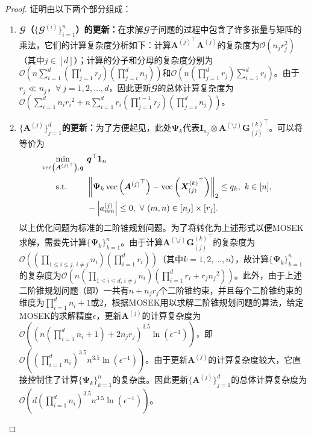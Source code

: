 \begin{proof}
证明由以下两个部分组成：
\begin{enumerate}
    \item \textbf{$\mathbfcal{G}$（$\{\mathbfcal{G}^{(i)}\}_{i=1}^{n}$）的更新：}在求解$\mathbfcal{G}$子问题的过程中包含了许多张量与矩阵的乘法，它们的计算复杂度分析如下：计算${\boldsymbol{A}^{(j)}}^{\top}\boldsymbol{A}^{(j)}$的复杂度为$\mathcal{O}(n_{j}{r}_j^{2})$（其中$j\in[d]$）；计算的分子和分母的复杂度分别为$\mathcal{O}(n\sum_{i=1}^{d}\allowbreak(\prod_{j=1}^{i}r_{j})\allowbreak(\prod_{j=i}^{d}n_{j}))$和$\mathcal{O}(n\allowbreak(\prod_{j=1}^{d}r_{j})\allowbreak\sum_{i=1}^{d}r_{i})$。由于$r_{j}\ll n_{j}$，$\forall~j =1,2,\ldots,d$，因此更新$\mathbfcal{G}$的总体计算复杂度为$\mathcal{O}(\sum_{i=1}^{d}n_{i}{r_i}^{2} + n\sum_{i=1}^{d}r_{i}\allowbreak(\prod_{j=1}^{i-1}r_{j})\allowbreak(\prod_{j=i}^{d}n_{j}))$。

    \item \textbf{$\{\boldsymbol{A}^{(j)}\}_{j=1}^{d}$的更新：}为了方便起见，此处$\boldsymbol{\Psi}_{k}$代表$\boldsymbol{I}_{n_{j}}\otimes \boldsymbol{A}^{(\setminus j)}\allowbreak {\boldsymbol{G}^{(k)}_{(j)}}^{\top}$。可以将等价为
\begin{equation}\label{eq:reform-socp}
	\begin{aligned}
		&\underset{\mathclap{\operatorname{vec}\left({\boldsymbol{A}^{(j)}}^{\top}\right),\boldsymbol{q}}}{\min} \quad && \boldsymbol{q}^{\top}\boldsymbol{1}_{n}\\
		&\text{s.t.} &&
		\left\|\boldsymbol{\Psi}_{k}\operatorname{vec}\left({\boldsymbol{A}^{(j)}}^{\top}\right)-\operatorname{vec}\left({\boldsymbol{X}^{(k)}_{(j)}}^{\top}\right)\right\|_{2} \le q_{k},~ k\in[n], \\\span&& -\abs{a^{(j)}_{mn}}\leq 0,~\forall~ (m,n)\in[n_{j}]\times[r_{j}].
		\end{aligned}
\end{equation}
以上优化问题为标准的二阶锥规划问题。为了将转化为上述形式以便MOSEK求解，需要先计算$\{\boldsymbol{\Psi}_{k}\}_{k=1}^{n}$。由于计算$\boldsymbol{A}^{(\setminus j)}{\boldsymbol{G}^{(k)}_{(j)}}^{\top}$的复杂度为$\mathcal{O}((\prod_{1\le i\le j,\,i\neq j}n_{i})\allowbreak(\prod_{i=1}^{d}r_{i}))$（其中$k=1,2,\ldots,n$），故计算$\{\boldsymbol{\Psi}_{k}\}_{k=1}^{n}$的复杂度为$\mathcal{O}(n(\prod_{1\le i\le d,\,i\neq j}n_{i})\allowbreak(\prod_{i=1}^{d}r_{i}+r_{j}{n_j}^{2}))$。此外，由于上述二阶锥规划问题（即）一共有$n+n_{j}r_{j}$个二阶锥约束，并且每个二阶锥约束的维度为$\prod_{i=1}^{d}n_{i}+1$或$2$，根据MOSEK用以求解二阶锥规划问题的算法，给定MOSEK的求解精度$\epsilon$，更新$\boldsymbol{A}^{(j)}$的计算复杂度为$\mathcal{O}((n(\prod_{i=1}^{d}n_{i}+1)+2n_{j}r_{j})^{3.5}\ln(\epsilon^{-1}))$，即$\mathcal{O}((\prod_{i=1}^{d}n_{i})^{3.5}n^{3.5}\ln(\epsilon^{-1}))$。由于更新$\boldsymbol{A}^{(j)}$的计算复杂度较大，它直接控制住了计算$\{\boldsymbol{\Psi}_{k}\}_{k=1}^{n}$的复杂度。因此更新$\{\boldsymbol{A}^{(j)}\}_{j=1}^{d}$的总体计算复杂度为$\mathcal{O}(d(\prod_{i=1}^{d}n_{i})^{3.5}n^{3.5}\ln(\epsilon^{-1}))$。
\end{enumerate}


\end{proof}
